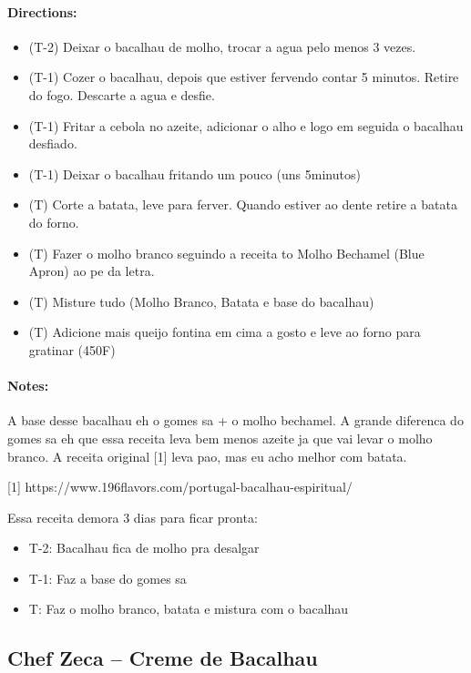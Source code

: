 \documentclass{article}
\begin{document}
\paragraph{Directions:}
\begin{itemize}
	\item (T-2) Deixar o bacalhau de molho, trocar a agua pelo menos 3 vezes.
	\item (T-1) Cozer o bacalhau, depois que estiver fervendo contar 5 minutos. Retire do fogo. Descarte a agua e desfie.
	\item (T-1) Fritar a cebola no azeite, adicionar o alho e logo em seguida o bacalhau desfiado.
	\item (T-1) Deixar o bacalhau fritando um pouco (uns 5minutos)
	\item (T) Corte a batata, leve para ferver. Quando estiver ao dente retire a batata do forno.
	\item (T) Fazer o molho branco seguindo a receita to Molho Bechamel (Blue Apron) ao pe da letra.
	\item (T) Misture tudo (Molho Branco, Batata e base do bacalhau)
	\item (T) Adicione mais queijo fontina em cima a gosto e leve ao forno para gratinar (450F)
\end{itemize}

\paragraph{Notes:}
A base desse bacalhau eh o gomes sa + o molho bechamel. A grande diferenca do gomes sa eh que essa receita leva bem menos azeite ja que vai levar o molho branco. A receita original [1] leva pao, mas eu acho melhor com batata.

[1] https://www.196flavors.com/portugal-bacalhau-espiritual/

Essa receita demora 3 dias para ficar pronta:
\begin{itemize}
	\item T-2: Bacalhau fica de molho pra desalgar
	\item T-1: Faz a base do gomes sa
	\item T: Faz o molho branco, batata e mistura com o bacalhau
\end{itemize}

\subsection{Chef Zeca – Creme de Bacalhau}
\end{document}
